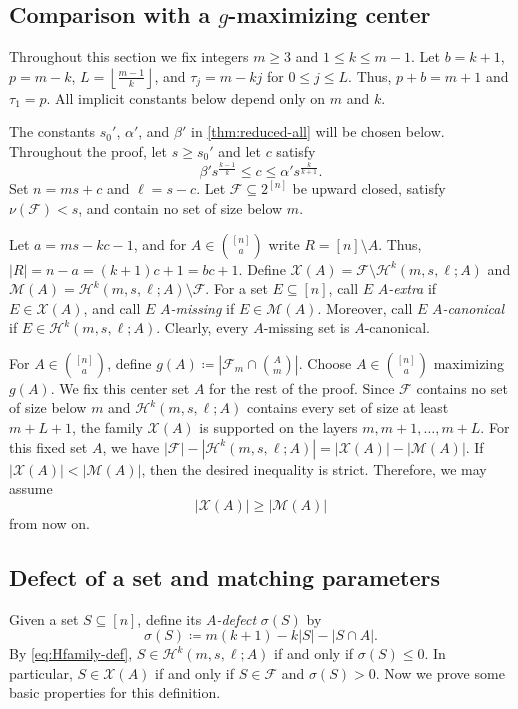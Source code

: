 \documentclass[10pt,a4paper]{article}
\numberwithin{equation}{section}
\theoremstyle{definition}
\newcommand{\F}{\mathcal F}
\newcommand{\X}{\mathcal X}
\newcommand{\M}{\mathcal M}
\begin{document}
\subsection{Comparison with a \texorpdfstring{$g$}{g}-maximizing center}

Throughout this section we fix integers $m\ge3$ and $1\le k\le m-1$.
Let $b=k+1$, $p=m-k$, $L=\left\lfloor\frac{m-1}{k}\right\rfloor$, and $\tau_j=m-kj$ for $0\le j\le L$.
Thus, $p+b=m+1$ and $\tau_1=p$.
All implicit constants below depend only on $m$ and $k$.

The constants $s_0'$, $\alpha'$, and $\beta'$ in \cref{thm:reduced-all} will be chosen below.
Throughout the proof, let $s\ge s_0'$ and let $c$ satisfy
\[
        \beta' s^{\frac{k-1}{k}}\le c\le \alpha' s^{\frac k{k+1}}.
\]
Set $n=ms+c$ and $\ell=s-c$.
Let $\F\subseteq2^{[n]}$ be upward closed, satisfy $\nu(\F)<s$, and contain no set of size below $m$.

Let $a=ms-kc-1$, and for $A\in\binom{[n]}a$ write $R=[n]\setminus A$.
Thus, $|R|=n-a=(k+1)c+1=bc+1$.
Define $\X(A)=\F\setminus\mathcal H^k(m,s,\ell;A)$ and $\M(A)=\mathcal H^k(m,s,\ell;A)\setminus\F$.
For a set $E\subseteq[n]$, call $E$ \emph{$A$-extra} if $E\in\X(A)$, and call $E$ \emph{$A$-missing} if $E\in\M(A)$.
Moreover, call $E$ \emph{$A$-canonical} if $E\in\mathcal H^k(m,s,\ell;A)$.
Clearly, every $A$-missing set is $A$-canonical.

For $A\in\binom{[n]}a$, define $g(A)\coloneqq |\F_m\cap\binom Am|$.
Choose $A\in\binom{[n]}a$ maximizing $g(A)$.
We fix this center set $A$ for the rest of the proof.
Since $\F$ contains no set of size below $m$ and $\mathcal H^k(m,s,\ell;A)$ contains every set of size at least $m+L+1$, the family $\X(A)$ is supported on the layers $m,m+1,\ldots,m+L$.
For this fixed set $A$, we have $|\F|-|\mathcal H^k(m,s,\ell;A)|=|\X(A)|-|\M(A)|$.
If $|\X(A)|<|\M(A)|$, then the desired inequality is strict.
Therefore, we may assume
\begin{equation}\label{eq:defect-nonstrict}
        |\X(A)|\ge |\M(A)|
\end{equation}
from now on.



\subsection{Defect of a set and matching parameters}

Given a set $S\subseteq[n]$, define its \emph{$A$-defect} $\sigma(S)$ by
\[
        \sigma(S)\coloneqq m(k+1)-k|S|-|S\cap A|.
\]
By \eqref{eq:Hfamily-def}, $S\in\mathcal H^k(m,s,\ell;A)$ if and only if $\sigma(S)\le0$.
In particular, $S\in\X(A)$ if and only if $S\in\F$ and $\sigma(S)>0$.
Now we prove some basic properties for this definition.
\end{document}

